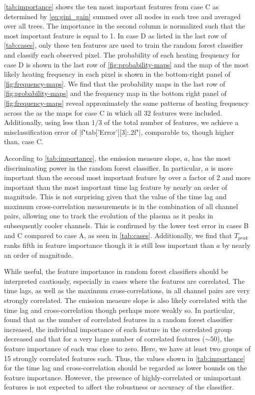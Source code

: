 \autoref{tab:importance} shows the ten most important features from case C as determined by \autoref{eq:gini_gain} summed over all nodes in each tree and averaged over all trees.
The importance in the second column is normalized such that the most important feature is equal to 1.
In case D as listed in the last row of \autoref{tab:cases}, only these ten features are used to train the random forest classifier and classify each observed pixel.
The probability of each heating frequency for case D is shown in the last row of \autoref{fig:probability-maps} and the map of the most likely heating frequency in each pixel is shown in the bottom-right panel of \autoref{fig:frequency-maps}.
We find that the probability maps in the last row of \autoref{fig:probability-maps} and the frequency map in the bottom right panel of \autoref{fig:frequency-maps} reveal approximately the same patterns of heating frequency across the \AR{} as the maps for case C in which all 32 features were included.
Additionally, using less than $1/3$ of the total number of features, we achieve a misclassification error of \py[manager_ml]|f"{tab['Error'][3]:.2f}"|, comparable to, though higher than, case C.

According to \autoref{tab:importance}, the emission measure slope, $a$, has the most discriminating power in the random forest classifier.
In particular, $a$ is more important than the second most important feature by over a factor of 2 and more important than the most important time lag feature by nearly an order of magnitude.
This is not surprising given that the value of the time lag and maximum cross-correlation measurements is in the combination of all channel pairs, allowing one to track the evolution of the plasma as it peaks in subsequently cooler channels.
This is confirmed by the lower test error in cases B and C compared to case A, as seen in \autoref{tab:cases}.
Additionally, we find that $T_{peak}$ ranks fifth in feature importance though it is still less important than $a$ by nearly an order of magnitude.

While useful, the feature importance in random forest classifiers should be interpreted cautiously, especially in cases where the features are correlated.
The time lags, as well as the maximum cross-correlations, in all channel pairs are very strongly correlated.
The emission measure slope is also likely correlated with the time lag and cross-correlation though perhaps more weakly so.
In particular, \citet{altmann_permutation_2010} found that as the number of correlated features in a random forest classifier increased, the individual importance of each feature in the correlated group decreased and that for a very large number of correlated features ($\sim50$), the feature importance of each was close to zero.
Here, we have at least two groups of 15 strongly correlated features each.
Thus, the values shown in \autoref{tab:importance} for the time lag and cross-correlation should be regarded as lower bounds on the feature importance. 
However, the presence of highly-correlated or unimportant features is not expected to affect the robustness or accuracy of the classifier.

